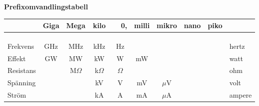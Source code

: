 


\begin{center}
		\textbf{\Huge{Prefixomvandlingstabell}}
\end{center}

\begin{longtable}{|l|c|c|c|c|c|c|c|c|c|c|c|l|c|c|c|c|c|c|c|c|c|c|c|c|l|} \hline
	&\multicolumn{3}{c}{Giga}\vline&\multicolumn{3}{c}{Mega}\vline&\multicolumn{3}{c}{kilo}\vline&\multicolumn{3}{r}{0,}\vline
	&\multicolumn{3}{c}{milli}\vline&\multicolumn{3}{c}{mikro}\vline&\multicolumn{3}{c}{nano}\vline&\multicolumn{3}{c}{piko}\vline & \\ \hline \hline
	& & & & & & & & & & & & & & & & & & & & & & & & & \\ \hline
	& & & & & & & & & & & & & & & & & & & & & & & & & \\ \hline
	& & & & & & & & & & & & & & & & & & & & & & & & & \\ \hline \hline
	Frekvens &\multicolumn{3}{c}{GHz}\vline & \multicolumn{3}{c}{MHz}\vline & \multicolumn{3}{c}{kHz}\vline & \multicolumn{3}{c}{Hz}\vline & \multicolumn{3}{c}{}\vline & \multicolumn{3}{c}{}\vline & \multicolumn{3}{c}{}\vline & \multicolumn{3}{c}{ }\vline & hertz \\ \hline 
	Effekt & \multicolumn{3}{c}{GW}\vline&\multicolumn{3}{c}{MW}\vline& \multicolumn{3}{c}{kW}\vline&\multicolumn{3}{c}{W}\vline&\multicolumn{3}{c}{mW}\vline &\multicolumn{3}{c}{}\vline&\multicolumn{3}{c}{}\vline&\multicolumn{3}{c}{ }\vline& watt \\ \hline
	Resistans& \multicolumn{3}{c}{}\vline&\multicolumn{3}{c}{M\(\Omega\)}\vline&\multicolumn{3}{c}{k\(\Omega\)}\vline &\multicolumn{3}{c}{\(\Omega\)}\vline&\multicolumn{3}{c}{}\vline &\multicolumn{3}{c}{}\vline&\multicolumn{3}{c}{}\vline&\multicolumn{3}{c}{ }\vline& ohm\\ \hline
	Spänning& \multicolumn{3}{c}{}\vline&\multicolumn{3}{c}{}\vline&\multicolumn{3}{c}{kV}\vline &\multicolumn{3}{c}{V}\vline&\multicolumn{3}{c}{mV}\vline &\multicolumn{3}{c}{\(\mu\)V}\vline&\multicolumn{3}{c}{}\vline&\multicolumn{3}{c}{ }\vline& volt\\ \hline
	Ström& \multicolumn{3}{c}{}\vline&\multicolumn{3}{c}{}\vline&\multicolumn{3}{c}{kA}\vline &\multicolumn{3}{c}{A}\vline&\multicolumn{3}{c}{mA}\vline &\multicolumn{3}{c}{\(\mu\)A}\vline&\multicolumn{3}{c}{}\vline&\multicolumn{3}{c}{ }\vline& ampere\\ \hline

\end{longtable}
